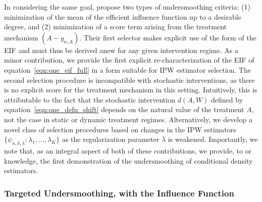 In considering the same goal, \citet{ertefaie2020nonparametric} propose two
types of undersmoothing criteria: (1) minimization of the mean of the efficient
influence function up to a desirable degree, and (2) minimization of a score
term arising from the treatment mechanism $(A - g_{n,A})$. Their first selector
makes explicit use of the form of the EIF and must thus be derived anew for any
given intervention regime. As a minor contribution, we provide the first
explicit re-characterization of the EIF of equation~\ref{eqn:one_eif_full} in
a form suitable for IPW estimator selection. The second selection procedure is
incompatible with stochastic interventions, as there is no explicit score for
the treatment mechanism in this setting. Intuitively, this is attributable to
the fact that the stochastic intervention $d(A,W)$ defined by
equation~\ref{eqn:one_defn_shift} depends on the natural value of the treatment
$A$, not the case in static or dynamic treatment regimes. Alternatively, we
develop a novel class of selection procedures based on changes in the IPW
estimators $\{\psi_{n,\delta,\lambda}: \lambda_1, \ldots, \lambda_K \}$ as the
regularization parameter $\lambda$ is weakened. Importantly, we note that, as an
integral aspect of both of these contributions, we provide, to or knowledge, the
first demonstration of the undersmoothing of conditional density estimators.

\subsubsection{Targeted Undersmoothing, with the Influence Function}

